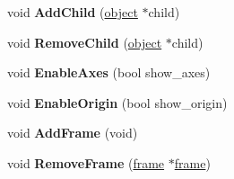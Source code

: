 \begin{DoxyCompactItemize}
void {\bfseries Add\+Child} (\hyperlink{classobject}{object} $\ast$child)
\item 
\mbox{\label{classobject_a19ce6355c2d3c1bf315190e6ac45c382}} 
void {\bfseries Remove\+Child} (\hyperlink{classobject}{object} $\ast$child)
\item 
\mbox{\label{classobject_a2c381e2defde6ee24acca434e6ee9fd0}} 
void {\bfseries Enable\+Axes} (bool show\+\_\+axes)
\item 
\mbox{\label{classobject_a287c47ea62fed1e3ece7ff6ac0398ea1}} 
void {\bfseries Enable\+Origin} (bool show\+\_\+origin)
\item 
\mbox{\label{classobject_a732616252ee8004c41b496905f1f8604}} 
void {\bfseries Add\+Frame} (void)
\item 
\mbox{\label{classobject_a39c3249be7b37b58c319b4f3c6311eda}} 
void {\bfseries Remove\+Frame} (\hyperlink{classframe}{frame} $\ast$\hyperlink{classframe}{frame})
\end{DoxyCompactItemize}
